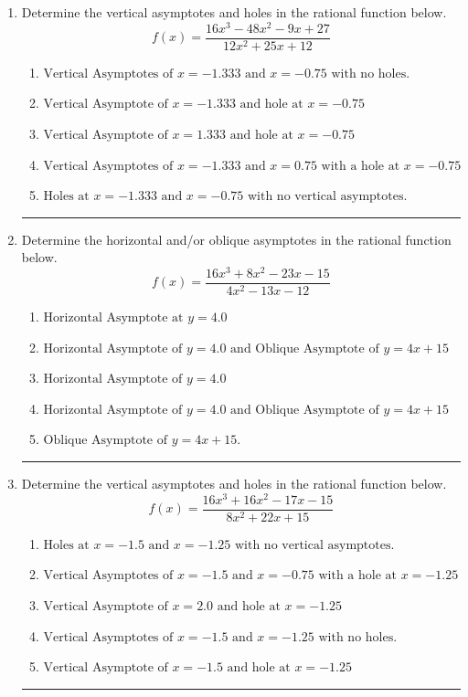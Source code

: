 \documentclass[14pt]{extbook}
\newcommand{\litem}[1]{\item#1\hspace*{-1cm}\rule{\textwidth}{0.4pt}}
\begin{document}
\begin{enumerate}
{\begin{enumerate}[label=\Alph*.]
\end{enumerate} }
\litem{
Determine the vertical asymptotes and holes in the rational function below.\[ f(x) = \frac{16x^{3} -48 x^{2} -9 x + 27}{12x^{2} +25 x + 12} \]\begin{enumerate}[label=\Alph*.]
\item \( \text{Vertical Asymptotes of } x = -1.333 \text{ and } x = -0.75 \text{ with no holes.} \)
\item \( \text{Vertical Asymptote of } x = -1.333 \text{ and hole at } x = -0.75 \)
\item \( \text{Vertical Asymptote of } x = 1.333 \text{ and hole at } x = -0.75 \)
\item \( \text{Vertical Asymptotes of } x = -1.333 \text{ and } x = 0.75 \text{ with a hole at } x = -0.75 \)
\item \( \text{Holes at } x = -1.333 \text{ and } x = -0.75 \text{ with no vertical asymptotes.} \)

\end{enumerate} }
\litem{
Determine the horizontal and/or oblique asymptotes in the rational function below.\[ f(x) = \frac{16x^{3} +8 x^{2} -23 x -15}{4x^{2} -13 x -12} \]\begin{enumerate}[label=\Alph*.]
\item \( \text{Horizontal Asymptote at } y = 4.0 \)
\item \( \text{Horizontal Asymptote of } y = 4.0 \text{ and Oblique Asymptote of } y = 4x + 15 \)
\item \( \text{Horizontal Asymptote of } y = 4.0  \)
\item \( \text{Horizontal Asymptote of } y = 4.0 \text{ and Oblique Asymptote of } y = 4x + 15 \)
\item \( \text{Oblique Asymptote of } y = 4x + 15. \)

\end{enumerate} }
\litem{
Determine the vertical asymptotes and holes in the rational function below.\[ f(x) = \frac{16x^{3} +16 x^{2} -17 x -15}{8x^{2} +22 x + 15} \]\begin{enumerate}[label=\Alph*.]
\item \( \text{Holes at } x = -1.5 \text{ and } x = -1.25 \text{ with no vertical asymptotes.} \)
\item \( \text{Vertical Asymptotes of } x = -1.5 \text{ and } x = -0.75 \text{ with a hole at } x = -1.25 \)
\item \( \text{Vertical Asymptote of } x = 2.0 \text{ and hole at } x = -1.25 \)
\item \( \text{Vertical Asymptotes of } x = -1.5 \text{ and } x = -1.25 \text{ with no holes.} \)
\item \( \text{Vertical Asymptote of } x = -1.5 \text{ and hole at } x = -1.25 \)


\end{enumerate}}
\end{enumerate}
\end{document}
